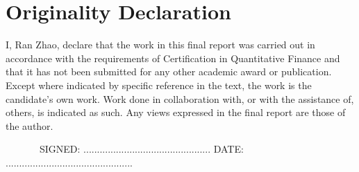 \chapter{Originality Declaration}

I, Ran Zhao, declare that the work in this final report was carried out in accordance with the requirements of Certification in Quantitative Finance and that it has not been submitted for any other academic award or publication. Except where indicated by specific  reference in the text, the work is the candidate's own work. Work done in collaboration with, or with the assistance of, others, is indicated as such. Any views expressed in the final report are those of the author.

\vspace{1.5cm}
\noindent
\hspace{-0.75cm}\textsc{ \ \ \ \ \ \ \ SIGNED: ............................................... DATE: ...............................................}


